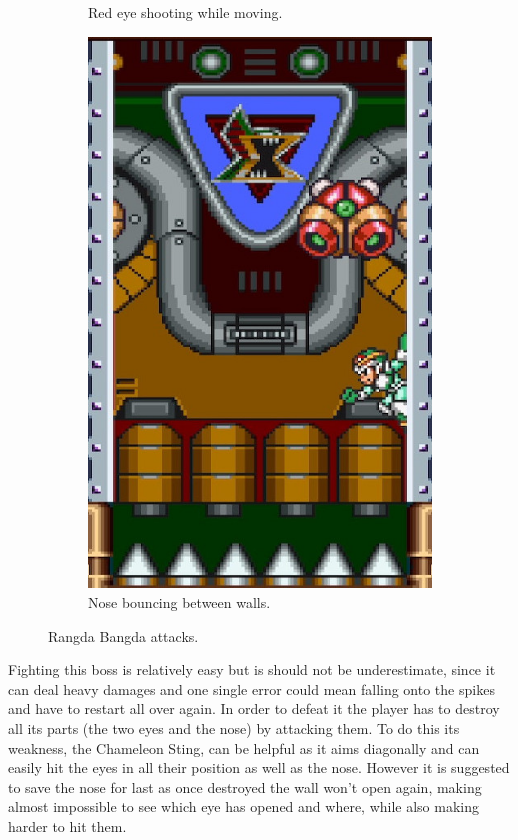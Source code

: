 \begin{figure}[htp]
\begin{subfigure}{0.40\linewidth}
		\caption{Red eye shooting while moving.}
	\end{subfigure}
	\hfil
	\begin{subfigure}{0.30\linewidth}
		\centering
		\includegraphics[width=\linewidth]{figures/X1/Sigma_stages/Rangda_nose.jpg}
		\caption{Nose bouncing between walls.}
	\end{subfigure}
	\caption{Rangda Bangda attacks.}
\end{figure} 
Fighting this boss is relatively easy but is should not be underestimate, since it can deal heavy damages and one single error could mean falling onto the spikes and have to restart all over again. In order to defeat it the player has to destroy all its parts (the two eyes and the nose)  by attacking them. To do this its weakness, the Chameleon Sting, can be helpful as it aims diagonally and can easily hit the eyes in all their position as well as the nose. However it is suggested to save the nose for last as once destroyed the wall won't open again, making almost impossible to see which eye has opened and where, while also making harder to hit them.

